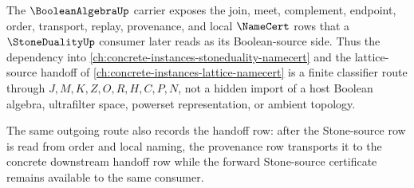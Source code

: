 The $\BooleanAlgebraUp$ carrier exposes the join, meet, complement, endpoint, order, transport, replay, provenance, and local $\NameCert$ rows that a $\StoneDualityUp$ consumer later reads as its Boolean-source side. Thus the dependency into \autoref{ch:concrete-instances-stoneduality-namecert} and the lattice-source handoff of \autoref{ch:concrete-instances-lattice-namecert} is a finite classifier route through $J,M,K,Z,O,R,H,C,P,N$, not a hidden import of a host Boolean algebra, ultrafilter space, powerset representation, or ambient topology.


The same outgoing route also records the handoff row: after the Stone-source row is read from order and local naming, the provenance row transports it to the concrete downstream handoff row while the forward Stone-source certificate remains available to the same consumer.

